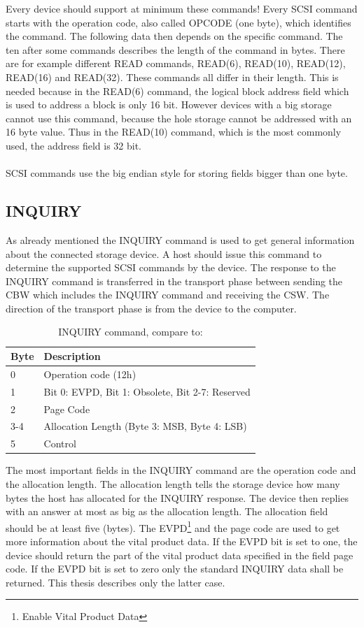 Every device should support at minimum these commands! Every SCSI command starts with the operation code, also called OPCODE (one byte), which identifies the command. The following data then depends on the specific command. The ten after some commands describes the length of the command in bytes. There are for example different READ commands, READ(6), READ(10), READ(12), READ(16) and READ(32)\cite{scsi_seagate}. These commands all differ in their length. This is needed because in the READ(6) command, the logical block address field which is used to address a block is only 16 bit. However devices with a big storage cannot use this command, because the hole storage cannot be addressed with an 16 byte value. Thus in the READ(10) command, which is the most commonly used, the address field is 32 bit.\\\\
SCSI commands use the big endian style for storing fields bigger than one byte.

\subsection{INQUIRY}

As already mentioned the INQUIRY command is used to get general information about the connected storage device. A host should issue this command to determine the supported SCSI commands by the device. The response to the INQUIRY command is transferred in the transport phase between sending the CBW which includes the INQUIRY command and receiving the CSW. The direction of the transport phase is from the device to the computer.

\begin{table}[ht]
\caption{INQUIRY command, compare to: \cite{scsi_seagate}}
\centering
\begin{tabular}{|l|l|}
\hline\hline
\textbf{Byte} & \textbf{Description}\\ \hline
0 & Operation code (12h) \\ \hline
1 & Bit 0: EVPD, Bit 1: Obsolete, Bit 2-7: Reserved\\ \hline
2 & Page Code \\ \hline
3-4 & Allocation Length (Byte 3: MSB, Byte 4: LSB) \\ \hline
5 & Control \\ \hline
\end{tabular}
\label{table:inquiry}
\end{table}

The most important fields in the INQUIRY command are the operation code and the allocation length. The allocation length tells the storage device how many bytes the host has allocated for the INQUIRY response. The device then replies with an answer at most as big as the allocation length. The allocation field should be at least five (bytes). The EVPD\footnote{Enable Vital Product Data} and the page code are used to get more information about the vital product data. If the EVPD bit is set to one, the device should return the part of the vital product data specified in the field page code. If the EVPD bit is set to zero only the standard INQUIRY data shall be returned\cite{scsi_seagate}. This thesis describes only the latter case.

